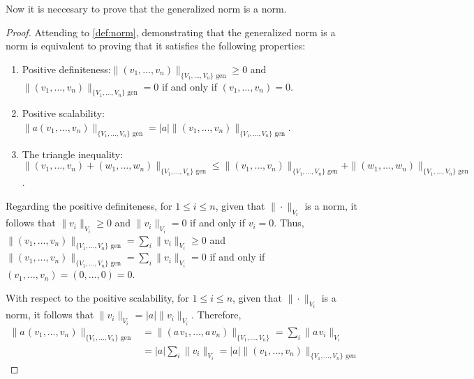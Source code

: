 Now it is neccesary to prove that the generalized norm is a norm.
\begin{proof}
Attending to \autoref{def:norm}, demonstrating that the generalized norm is a norm is equivalent to proving that it satisfies the following properties:
\begin{enumerate}
  \item Positive definiteness:$\|(v_1, \ldots, v_n)\|_{\{V_1,\ldots,V_n\} \text{ gen}} \geq 0$ and $\|(v_1, \ldots, v_n)\|_{\{V_1,\ldots,V_n\} \text{ gen}} = 0$ if and only if $(v_1, \ldots, v_n) = 0$.
  \item Positive scalability: $\|a(v_1, \ldots, v_n)\|_{\{V_1,\ldots,V_n\} \text{ gen}} = |a| \|(v_1, \ldots, v_n)\|_{\{V_1,\ldots,V_n\} \text{ gen}}$.
  \item The triangle inequality: $\|(v_1, \ldots, v_n) + (w_1, \ldots, w_n)\|_{\{V_1,\ldots,V_n\} \text{ gen}} \leq \|(v_1, \ldots, v_n)\|_{\{V_1,\ldots,V_n\} \text{ gen}} + \|(w_1, \ldots, w_n)\|_{\{V_1,\ldots,V_n\} \text{ gen}}$.
\end{enumerate}

Regarding the positive definiteness, for $ 1 \leq i \leq n$,  given that  $\|\cdot\|_{V_i}$ is a norm, it follows that $\|v_i\|_{V_i} \geq 0$ and $\|v_i\|_{V_i} = 0$ if and only if $v_i = 0$. Thus, $\|(v_1, \ldots, v_n)\|_{\{V_1,\ldots,V_n\} \text{ gen}} = \sum_i \|v_i\|_{V_i}  \geq 0$ and $\|(v_1, \ldots, v_n)\|_{\{V_1,\ldots,V_n\} \text{ gen}} =  \sum_i \|v_i\|_{V_i} = 0$ if and only if $(v_1, \ldots, v_n) = (0, \ldots,0) = 0$.

With respect to the positive scalability, for $ 1 \leq i \leq n$,  given that  $\|\cdot\|_{V_i}$ is a norm, it follows that $\| v_i\|_{V_i}$ = $|a| \|v_i\|_{V_i}$. Therefore, 
\begin{align*}
  \|a\hspace{1pt} (v_1, \ldots, v_n)\|_{\{V_1,\ldots,V_n\} \text{ gen}} &  = \|(a \hspace{1pt} v_1, \ldots, a \hspace{1pt} v_n)\|_{\{V_1,\ldots,V_n\}} = \sum_i \|a \hspace{1pt} v_i\|_{V_i} \\
  & = |a| \sum_i \|v_i\|_{V_i} = |a| \|(v_1, \ldots, v_n)\|_{\{V_1,\ldots,V_n\} \text{ gen}}
\end{align*}


\end{proof}
